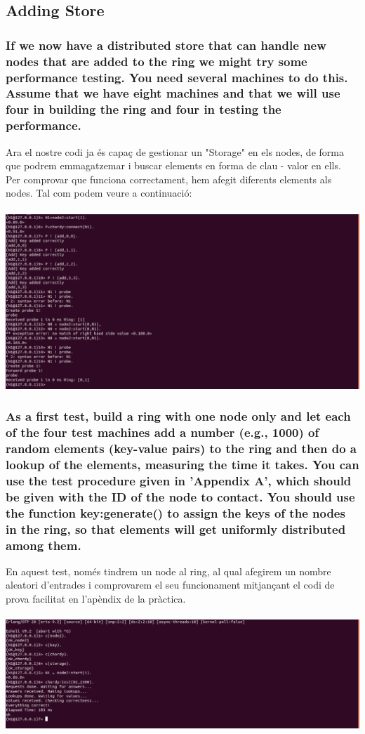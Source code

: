 \documentclass[a4paper, 10pt]{article}
\begin{document}
\subsection{Adding Store}
\subsubsection{ If we now have a distributed store that can handle new nodes that are added to the ring we might try some performance testing. You need several machines to do this. Assume that we have eight machines and that we will use four in building the ring and four in testing the performance.}

Ara el nostre codi ja és capaç de gestionar un "Storage" en els nodes, de forma que podrem emmagatzemar i buscar elements en forma de clau - valor en ells.\\
Per comprovar que funciona correctament, hem afegit diferents elements als nodes. Tal com podem veure a continuació:\\\\
\includegraphics[width=\textwidth]{Ex2.png}

\subsubsection{As a first test, build a ring with one node only and let each of the four test machines add a number (e.g., 1000) of random elements (key-value pairs) to the ring and then do a lookup of the elements, measuring the time it takes. You can use the test procedure given in ’Appendix A’, which should be given with the ID of the node to contact. You should use the function key:generate() to assign the keys of the nodes in the ring, so that elements will get uniformly distributed among them.}

En aquest test, només tindrem un node al ring, al qual afegirem un nombre aleatori d'entrades i comprovarem el seu funcionament mitjançant el codi de prova facilitat en l'apèndix de la pràctica.\\\\
\includegraphics[width=\textwidth]{Ex3.png}
\end{document}
